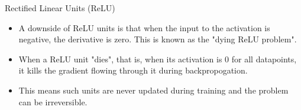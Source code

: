 \begin{frame} {Rectified Linear Units (ReLU)}
  \begin{itemize}
  \item A downside of ReLU units is that when the input to the activation is negative, the derivative is zero. This is known as the "dying ReLU problem".
    \begin{figure}
      \centering
    \end{figure}
    \item When a ReLU unit "dies", that is, when its activation is 0 for all datapoints, it kills the gradient flowing through it during backpropogation.
    \item This means such units are never updated during training and the problem can be irreversible.
   
  \end{itemize}
\end{frame}


